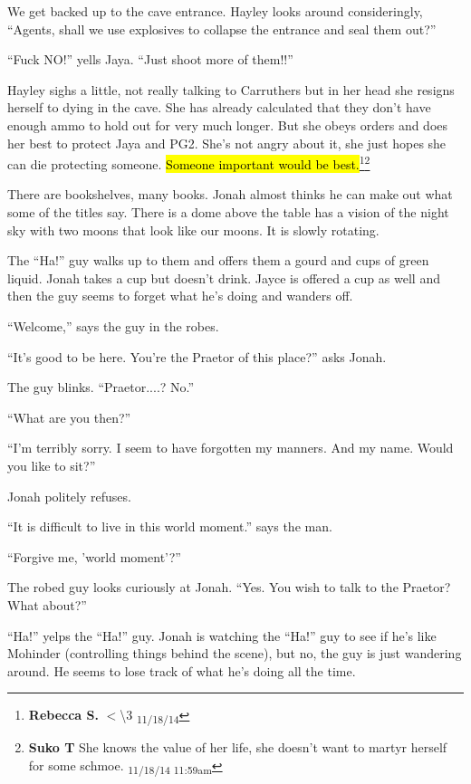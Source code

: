 We get backed up to the cave entrance.  Hayley looks around consideringly,  ``Agents, shall we use explosives to collapse the entrance and seal them out?''

``Fuck NO!'' yells Jaya.  ``Just shoot more of them!!''

Hayley sighs a little, not really talking to Carruthers but in her head she resigns herself to dying in the cave.  She has already calculated that they don't have enough ammo to hold out for very much longer.  But she obeys orders and does her best to protect Jaya and PG2.  She's not angry about it, she just hopes she can die protecting someone.  \hl{Someone important would be best.}\footnote{\textbf{Rebecca S. }$<$\textbackslash3 \textsubscript{11/18/14}}\footnote{\textbf{Suko T }She knows the value of her life, she doesn't want to martyr herself for some schmoe. \textsubscript{11/18/14 11:59am}}





There are bookshelves, many books.  Jonah almost thinks he can make out what some of the titles say.  There is a dome above the table has a vision of the night sky with two moons that look like our moons.  It is slowly rotating.



The ``Ha!'' guy walks up to them and offers them a gourd and cups of green liquid.  Jonah takes a cup but doesn't drink.  Jayce is offered a cup as well and then the guy seems to forget what he's doing and wanders off.



``Welcome,'' says the guy in the robes.

``It's good to be here.  You're the Praetor of this place?'' asks Jonah.

The guy blinks. ``Praetor....?  No.''

``What are you then?''

``I'm terribly sorry.  I seem to have forgotten my manners.  And my name.  Would you like to sit?''

Jonah politely refuses.

``It is difficult to live in this world moment.'' says the man.

``Forgive me, 'world moment'?''

The robed guy looks curiously at Jonah. ``Yes.  You wish to talk to the Praetor?  What about?''

``Ha!'' yelps the ``Ha!'' guy.  Jonah is watching the ``Ha!'' guy to see if he's like Mohinder (controlling things behind the scene), but no, the guy is just wandering around.  He seems to lose track of what he's doing all the time.

